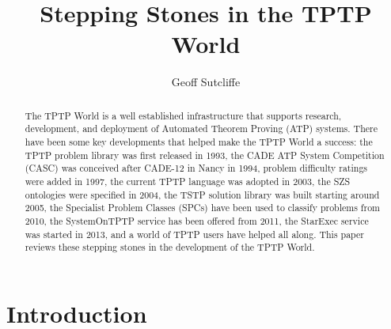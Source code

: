 \documentclass{easychair}
\title{Stepping Stones in the TPTP World}
\author{
  Geoff Sutcliffe
}
\institute{
  University of Miami,
  Miami, USA\\
  \email{geoff@cs.miami.edu}\\
}
\begin{document}
\maketitle

\begin{abstract}
The TPTP World is a well established infrastructure that supports research, development, and 
deployment of Automated Theorem Proving (ATP) systems.
There have been some key developments that helped make the TPTP World a success: 
the TPTP problem library was first released in 1993,
the CADE ATP System Competition (CASC) was conceived after CADE-12 in Nancy in 1994, 
problem difficulty ratings were added in 1997, 
the current TPTP language was adopted in 2003, 
the SZS ontologies were specified in 2004, 
the TSTP solution library was built starting around 2005, 
the Specialist Problem Classes (SPCs) have been used to classify problems from 2010, 
the SystemOnTPTP service has been offered from 2011, 
the StarExec service was started in 2013,
and 
a world of TPTP users have helped all along.
This paper reviews these stepping stones in the development of the TPTP World.
\end{abstract}
\section{Introduction}
\label{Introduction}
\end{document}
